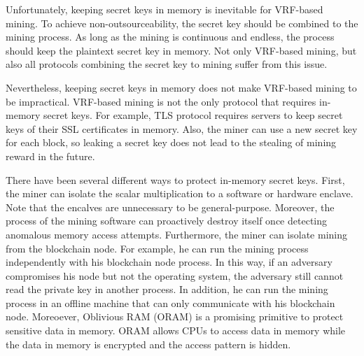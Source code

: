 Unfortunately, keeping secret keys in memory is inevitable for VRF-based mining. To achieve non-outsourceability, the secret key should be combined to the mining process. As long as the mining is continuous and endless, the process should keep the plaintext secret key in memory. Not only VRF-based mining, but also all protocols combining the secret key to mining suffer from this issue.

Nevertheless, keeping secret keys in memory does not make VRF-based mining to be impractical.
VRF-based mining is not the only protocol that requires in-memory secret keys.
For example, TLS protocol requires servers to keep secret keys of their SSL certificates in memory.
Also, the miner can use a new secret key for each block, so leaking a secret key does not lead to the stealing of mining reward in the future.

There have been several different ways to protect in-memory secret keys.
First, the miner can isolate the scalar multiplication to a software or hardware enclave. Note that the encalves are unnecessary to be general-purpose. Moreover, the process of the mining software can proactively destroy itself once detecting anomalous memory access attempts.
Furthermore, the miner can isolate mining from the blockchain node.
For example, he can run the mining process independently with his blockchain node process.
In this way, if an adversary compromises his node but not the operating system, the adversary still cannot read the private key in another process.
In addition, he can run the mining process in an offline machine that can only communicate with his blockchain node.
Moreoever, Oblivious RAM (ORAM) is a promising primitive to protect sensitive data in memory.
ORAM allows CPUs to access data in memory while the data in memory is encrypted and the access pattern is hidden.

